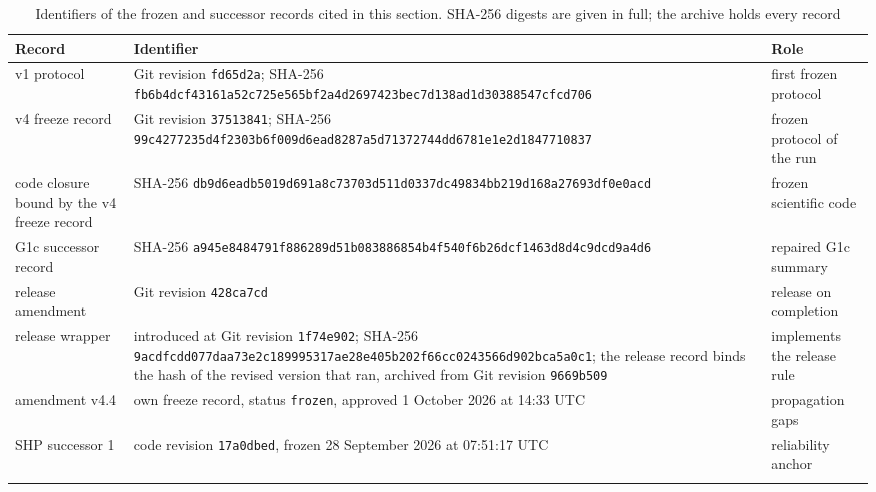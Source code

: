 \begin{table}[htbp]
\caption{Identifiers of the frozen and successor records cited in this section. SHA-256 digests are given in full; the archive holds every record}\label{tab:record-identifiers}
\centering\footnotesize
\begin{tabular}{@{}>{\raggedright\arraybackslash}p{}>{\raggedright\arraybackslash}p{}>{\raggedright\arraybackslash}p{}@{}}
\toprule
Record & Identifier & Role \\
\midrule
v1 protocol & Git revision \texttt{fd65d2a}; SHA-256 \texttt{fb6b4dcf4316}\allowbreak\texttt{1a52c725e565}\allowbreak\texttt{bf2a4d269742}\allowbreak\texttt{3bec7d138ad1}\allowbreak\texttt{d30388547cfc}\allowbreak\texttt{d706} & first frozen protocol \\
v4 freeze record & Git revision \texttt{37513841}; SHA-256 \texttt{99c4277235d4}\allowbreak\texttt{f2303b6f009d}\allowbreak\texttt{6ead8287a5d7}\allowbreak\texttt{1372744dd678}\allowbreak\texttt{1e1e2d184771}\allowbreak\texttt{0837} & frozen protocol of the run \\
code closure bound by the v4 freeze record & SHA-256 \texttt{db9d6eadb5019d69}\allowbreak\texttt{1a8c73703d511d03}\allowbreak\texttt{37dc49834bb219d1}\allowbreak\texttt{68a27693df0e0acd} & frozen scientific code \\
G1c successor record & SHA-256 \texttt{a945e848}\allowbreak\texttt{4791f886}\allowbreak\texttt{289d51b0}\allowbreak\texttt{83886854}\allowbreak\texttt{b4f540f6}\allowbreak\texttt{b26dcf14}\allowbreak\texttt{63d8d4c9}\allowbreak\texttt{dcd9a4d6} & repaired G1c summary \\
release amendment & Git revision \texttt{428ca7cd} & release on completion \\
release wrapper & introduced at Git revision \texttt{1f74e902}; SHA-256 \texttt{9acdfcdd}\allowbreak\texttt{077daa73}\allowbreak\texttt{e2c18999}\allowbreak\texttt{5317ae28}\allowbreak\texttt{e405b202}\allowbreak\texttt{f66cc024}\allowbreak\texttt{3566d902}\allowbreak\texttt{bca5a0c1}; the release record binds the hash of the revised version that ran, archived from Git revision \texttt{9669b509} & implements the release rule \\
amendment v4.4 & own freeze record, status \texttt{frozen}, approved 1 October 2026 at 14:33 UTC & propagation gaps \\
SHP successor 1 & code revision \texttt{17a0dbed}, frozen 28 September 2026 at 07:51:17 UTC & reliability anchor \\
\botrule
\end{tabular}
\end{table}

